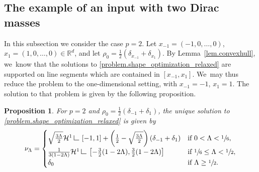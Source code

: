 \documentclass[11pt]{article}
\numberwithin{equation}{section}
\newtheorem{proposition}[theorem]{Proposition}
\theoremstyle{definition}
\newcommand\LM[1]{\hbox{\vrule width.5pt \vbox to#1pt{\vfill \hrule width#1pt height.5pt}}}
\newcommand\LL{{\mathchoice {\>\LM7\>}{\>\LM7\>}{\,\LM5\,}{\,\LM{3.35}\,}}}
\newcommand{\mres}{\LL}
\newcommand\cH{\mathcal{H}}
\newcommand{\RR}{\mathbb{R}}
\newcommand{\ci}[2]{ \left[ #1, #2 \right] }
\begin{document}
\subsection{The example of an input with two Dirac masses}
In this subsection we consider the case $p=2$. Let $x_{-1}=(-1,0,\ldots, 0)$, $x_{1}=(1,0,\ldots,0) \in \RR^d$, and let $\rho_0=\frac{1}{2}\left(\delta_{x_{-1}}+\delta_{x_{1}}\right)$. By Lemma~\ref{lem.convexhull}, we~know that the solutions to \eqref{problem.shape_optimization_relaxed} are supported on line segments which are contained in $\ci{x_{-1}}{x_1}$. We~may thus reduce the problem to the one-dimensional setting, with $x_{-1}=-1$, $x_{1}=1$. The solution to that problem is given by the following proposition.

\begin{proposition}
For $p=2$ and $\rho_0=\frac{1}{2}\left(\delta_{-1}+\delta_{1}\right)$, the unique solution to \eqref{problem.shape_optimization_relaxed} is given by
\begin{align}
\nu_\Lambda = \begin{cases}
\sqrt{\frac{3\Lambda}{2}}\cH^1\mres\ci{-1}{1} + \left(\frac{1}{2}-\sqrt{\frac{3\Lambda}{2}}\right)(\delta_{-1}+\delta_1) & \mbox{if $0<\Lambda<\sfrac{1}{6}$},\\
\frac{1}{3(1-2\Lambda)}\cH^1\mres\ci{-\frac{3}{2}(1-2\Lambda)}{\frac{3}{2}(1-2\Lambda)} &\mbox{if $\sfrac{1}{6}\le \Lambda <\sfrac{1}{2}$},\\
\delta_0 & \mbox{if $\Lambda\geq \sfrac{1}{2}$}.
\end{cases} \label{eq:}
\end{align}
\end{proposition}
\end{document}
